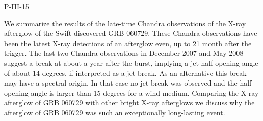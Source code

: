 P-III-15


\bigskip



\bigskip

\noindent We summarize the results of the late-time Chandra observations of the X-ray afterglow of the Swift-discovered GRB 060729. These Chandra observations have been the latest X-ray detections of an afterglow even, up to 21 month after the trigger. The last two Chandra observations in December 2007 and May 2008 suggest a break at about a year after the burst, implying a jet half-opening angle of about 14 degrees, if interpreted as a jet break. As an alternative this break may have a spectral origin. In that case no jet break was observed and the half-opening angle is larger than 15 degrees for a wind medium. Comparing the X-ray afterglow of GRB 060729 with other bright X-ray afterglows we discuss why the afterglow of GRB 060729 was such an exceptionally long-lasting event.

